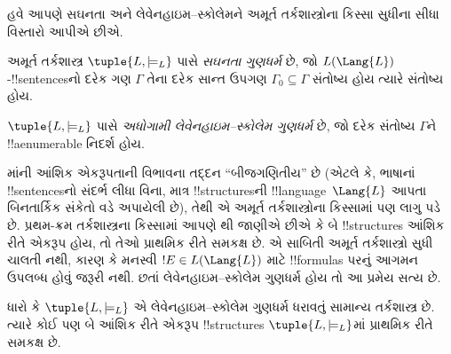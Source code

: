 \documentclass[../../../include/open-logic-section]{subfiles}
\begin{document}


હવે આપણે સઘનતા અને લેવેનહાઇમ--સ્કોલેમને અમૂર્ત તર્કશાસ્ત્રોના કિસ્સા
સુધીના સીધા વિસ્તારો આપીએ છીએ.

\begin{defn}
અમૂર્ત તર્કશાસ્ત્ર $\tuple{L, \models_L}$ પાસે \emph{સઘનતા
  ગુણધર્મ} છે, જો $L(\Lang{L})$-!!{sentence}sનો દરેક ગણ $\Gamma$ તેના
દરેક સાન્ત ઉપગણ $\Gamma_0 \subseteq \Gamma$ સંતોષ્ય હોય ત્યારે સંતોષ્ય
હોય.
\end{defn}

\begin{defn}
$\tuple{L, \models_L}$ પાસે \emph{અધોગામી લેવેનહાઇમ--સ્કોલેમ
  ગુણધર્મ} છે, જો દરેક સંતોષ્ય $\Gamma$ને !!a{enumerable} નિદર્શ હોય.
\end{defn}


માંની આંશિક એકરૂપતાની વિભાવના તદ્દન
``બીજગણિતીય'' છે (એટલે કે, ભાષાનાં !!{sentence}sનો સંદર્ભ લીધા વિના,
માત્ર !!{structure}sની !!{language}~$\Lang{L}$ આપતા બિનતાર્કિક સંકેતો
વડે અપાયેલી છે), તેથી એ અમૂર્ત તર્કશાસ્ત્રોના કિસ્સામાં પણ લાગુ પડે છે.
પ્રથમ-ક્રમ તર્કશાસ્ત્રના કિસ્સામાં આપણે
થી જાણીએ છીએ કે બે !!{structure}s આંશિક
રીતે એકરૂપ હોય, તો તેઓ પ્રાથમિક રીતે સમકક્ષ છે. એ સાબિતી અમૂર્ત
તર્કશાસ્ત્રો સુધી ચાલતી નથી, કારણ કે મનસ્વી $!E \in L(\Lang{L})$ માટે
!!{formula}s પરનું આગમન ઉપલબ્ધ હોવું જરૂરી નથી. છતાં લેવેનહાઇમ--સ્કોલેમ
ગુણધર્મ હોય તો આ પ્રમેય સત્ય છે.

\begin{thm}
ધારો કે $\tuple{L, \models_L}$ એ લેવેનહાઇમ--સ્કોલેમ ગુણધર્મ ધરાવતું
સામાન્ય તર્કશાસ્ત્ર છે. ત્યારે કોઈ પણ બે આંશિક રીતે એકરૂપ
!!{structure}s $\tuple{L, \models_L}$માં પ્રાથમિક રીતે સમકક્ષ છે.
\end{thm}
\end{document}
